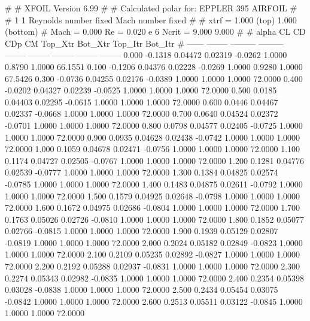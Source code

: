 #  
#       XFOIL         Version 6.99
#  
# Calculated polar for: EPPLER 395 AIRFOIL                              
#  
# 1 1 Reynolds number fixed          Mach number fixed         
#  
# xtrf =   1.000 (top)        1.000 (bottom)  
# Mach =   0.000     Re =     0.020 e 6     Ncrit =   9.000  9.000
#  
#   alpha    CL        CD       CDp       CM     Top_Xtr  Bot_Xtr  Top_Itr  Bot_Itr
#  ------ -------- --------- --------- -------- -------- -------- -------- --------
   0.000  -0.1318   0.04472   0.02319  -0.0262   1.0000   0.8790   1.0000  66.1551
   0.100  -0.1206   0.04376   0.02228  -0.0269   1.0000   0.9280   1.0000  67.5426
   0.300  -0.0736   0.04255   0.02176  -0.0389   1.0000   1.0000   1.0000  72.0000
   0.400  -0.0202   0.04327   0.02239  -0.0525   1.0000   1.0000   1.0000  72.0000
   0.500   0.0185   0.04403   0.02295  -0.0615   1.0000   1.0000   1.0000  72.0000
   0.600   0.0446   0.04467   0.02337  -0.0668   1.0000   1.0000   1.0000  72.0000
   0.700   0.0640   0.04524   0.02372  -0.0701   1.0000   1.0000   1.0000  72.0000
   0.800   0.0798   0.04577   0.02405  -0.0725   1.0000   1.0000   1.0000  72.0000
   0.900   0.0935   0.04628   0.02438  -0.0742   1.0000   1.0000   1.0000  72.0000
   1.000   0.1059   0.04678   0.02471  -0.0756   1.0000   1.0000   1.0000  72.0000
   1.100   0.1174   0.04727   0.02505  -0.0767   1.0000   1.0000   1.0000  72.0000
   1.200   0.1281   0.04776   0.02539  -0.0777   1.0000   1.0000   1.0000  72.0000
   1.300   0.1384   0.04825   0.02574  -0.0785   1.0000   1.0000   1.0000  72.0000
   1.400   0.1483   0.04875   0.02611  -0.0792   1.0000   1.0000   1.0000  72.0000
   1.500   0.1579   0.04925   0.02648  -0.0798   1.0000   1.0000   1.0000  72.0000
   1.600   0.1672   0.04975   0.02686  -0.0804   1.0000   1.0000   1.0000  72.0000
   1.700   0.1763   0.05026   0.02726  -0.0810   1.0000   1.0000   1.0000  72.0000
   1.800   0.1852   0.05077   0.02766  -0.0815   1.0000   1.0000   1.0000  72.0000
   1.900   0.1939   0.05129   0.02807  -0.0819   1.0000   1.0000   1.0000  72.0000
   2.000   0.2024   0.05182   0.02849  -0.0823   1.0000   1.0000   1.0000  72.0000
   2.100   0.2109   0.05235   0.02892  -0.0827   1.0000   1.0000   1.0000  72.0000
   2.200   0.2192   0.05288   0.02937  -0.0831   1.0000   1.0000   1.0000  72.0000
   2.300   0.2274   0.05343   0.02982  -0.0835   1.0000   1.0000   1.0000  72.0000
   2.400   0.2354   0.05398   0.03028  -0.0838   1.0000   1.0000   1.0000  72.0000
   2.500   0.2434   0.05454   0.03075  -0.0842   1.0000   1.0000   1.0000  72.0000
   2.600   0.2513   0.05511   0.03122  -0.0845   1.0000   1.0000   1.0000  72.0000
